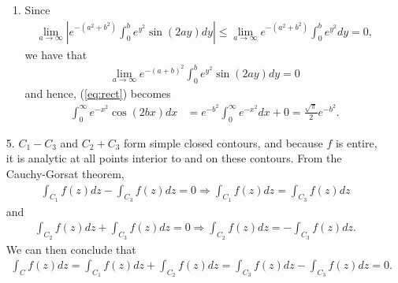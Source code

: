 \documentclass[a4paper,12pt]{article}
\begin{document}
\begin{enumerate}
\begin{enumerate}
            \item
                Since
                \begin{align*}
                    \lim_{a \to \infty} \left| e^{-(a^2 + b^2)} \int_0^b e^{y^2} \sin(2ay) dy \right| \leq \lim_{a \to \infty} e^{-(a^2 + b^2)} \int_0^b e^{y^2} dy = 0,
                \end{align*}
                we have that
                \begin{align*}
                    \lim_{a \to \infty} e^{-(a + b)^2} \int_0^b e^{y^2} \sin(2ay) dy = 0
                \end{align*}
                and hence, (\ref{eq:rect}) becomes
                \begin{align*}
                    \int_0^\infty e^{-x^2} \cos(2bx) dx &= e^{-b^2} \int_0^\infty e^{-x^2} dx + 0 = \frac{\sqrt{\pi}}{2} e^{-b^2}.
                \end{align*}
        \end{enumerate}

    \item[5.]
        $C_1 - C_3$ and $C_2 + C_3$ form simple closed contours, and because $f$ is entire, it is analytic at all points interior to and on these contours. From the Cauchy-Gorsat theorem,
        \begin{align*}
            \int_{C_1} f(z) dz - \int_{C_3} f(z) dz = 0 \Rightarrow \int_{C_1} f(z) dz = \int_{C_3} f(z) dz
        \end{align*}
        and
        \begin{align*}
            \int_{C_2} f(z) dz + \int_{C_3} f(z) dz = 0 \Rightarrow \int_{C_2} f(z) dz = -\int_{C_3} f(z) dz.
        \end{align*}
        We can then conclude that
        \begin{align*}
            \int_C f(z) dz = \int_{C_1} f(z) dz + \int_{C_2} f(z) dz = \int_{C_3} f(z) dz - \int_{C_3} f(z) dz = 0.
        \end{align*}
\end{enumerate}
\end{document}
